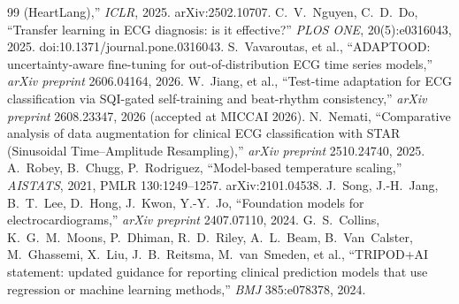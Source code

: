 \documentclass[final,5p,times,nonatbib]{elsarticle}
\begin{document}
\begin{thebibliography}{99}
(HeartLang),'' \emph{ICLR}, 2025. arXiv:2502.10707.
 C.~V.~Nguyen, C.~D.~Do, ``Transfer learning in ECG
diagnosis: is it effective?'' \emph{PLOS ONE}, 20(5):e0316043, 2025.
doi:10.1371/journal.pone.0316043.
 S.~Vavaroutas, et al., ``ADAPTOOD:
uncertainty-aware fine-tuning for out-of-distribution ECG time series
models,'' \emph{arXiv preprint} 2606.04164, 2026.
 W.~Jiang, et al., ``Test-time adaptation for ECG
classification via SQI-gated self-training and beat-rhythm
consistency,'' \emph{arXiv preprint} 2608.23347, 2026 (accepted at
MICCAI 2026).
 N.~Nemati, ``Comparative analysis of data
augmentation for clinical ECG classification with STAR (Sinusoidal
Time--Amplitude Resampling),'' \emph{arXiv preprint} 2510.24740, 2025.
 A.~Robey, B.~Chugg, P.~Rodriguez,
``Model-based temperature scaling,'' \emph{AISTATS}, 2021,
PMLR 130:1249--1257. arXiv:2101.04538.
 J.~Song, J.-H.~Jang, B.~T.~Lee, D.~Hong,
J.~Kwon, Y.-Y.~Jo, ``Foundation models for electrocardiograms,''
\emph{arXiv preprint} 2407.07110, 2024.
 G.~S.~Collins, K.~G.~M.~Moons, P.~Dhiman,
R.~D.~Riley, A.~L.~Beam, B.~Van~Calster, M.~Ghassemi, X.~Liu,
J.~B.~Reitsma, M.~van~Smeden, et al., ``TRIPOD+AI statement: updated
guidance for reporting clinical prediction models that use regression
or machine learning methods,'' \emph{BMJ} 385:e078378, 2024.
\end{thebibliography}
\end{document}
